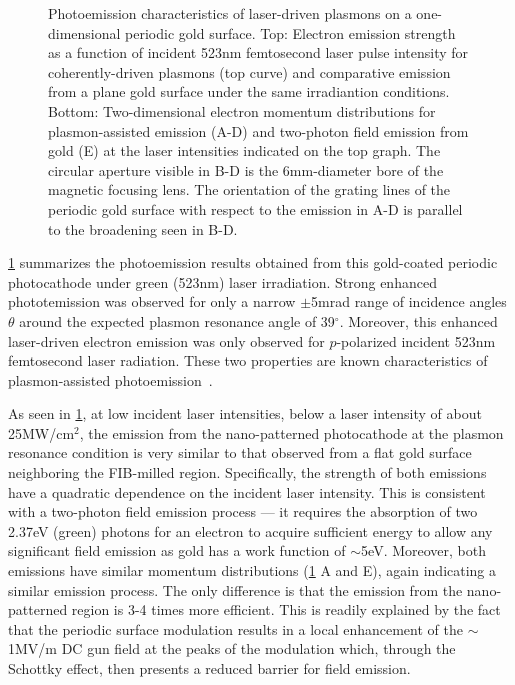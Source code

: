 \begin{figure}
  \centering
  
  \caption[Photoemission characteristics of laser-driven plasmons on a one-dimensional periodic gold surface]{
    Photoemission characteristics of laser-driven plasmons on a one-dimensional periodic gold surface.
    Top: Electron emission strength as a function of incident 523nm femtosecond laser pulse intensity for coherently-driven plasmons (top curve)
      and comparative emission from a plane gold surface under the same irradiantion conditions.
    Bottom: Two-dimensional electron momentum distributions for plasmon-assisted emission (A-D) and two-photon field emission from gold (E) at the laser intensities indicated on the top graph.
    The circular aperture visible in B-D is the 6mm-diameter bore of the magnetic focusing lens.
    The orientation of the grating lines of the periodic gold surface with respect to the emission in A-D is parallel to the broadening seen in B-D.
  }
  \label{fig:pape}
\end{figure}

\ref{fig:pape} summarizes the photoemission results obtained from this gold-coated periodic photocathode under green (523nm) laser irradiation.
Strong enhanced phototemission was observed for only a narrow $\pm$5mrad range of incidence angles $\theta$ around the expected plasmon resonance angle of 39$^{\circ}$.
Moreover, this enhanced laser-driven electron emission was only observed for $p$-polarized incident 523nm femtosecond laser radiation.
These two properties are known characteristics of plasmon-assisted photoemission~\cite{kupersztych_ponderomotive_2001,kupersztych_anomalous_2005,li_surface_2013}.

As seen in \ref{fig:pape}, at low incident laser intensities, below a laser intensity of about 25MW/cm$^2$, the emission from the nano-patterned photocathode at the plasmon resonance condition is very similar to that observed from a flat gold surface neighboring the FIB-milled region.
Specifically, the strength of both emissions have a quadratic dependence on the incident laser intensity.
This is consistent with a two-photon field emission process --- it requires the absorption of two 2.37eV (green) photons for an electron to acquire sufficient energy to allow any significant field emission as gold has a work function of $\sim$5eV.
Moreover, both emissions have similar momentum distributions (\ref{fig:pape} A and E), again indicating a similar emission process.
The only difference is that the emission from the nano-patterned region is 3-4 times more efficient.
This is readily explained by the fact that the periodic surface modulation results in a local enhancement of the $\sim$1MV/m DC gun field at the peaks of the modulation which, through the Schottky effect, then presents a reduced barrier for field emission.

